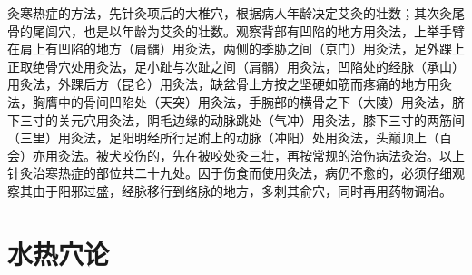 \documentclass[a4paper,12pt,UTF8,twoside]{ctexbook}
\begin{document}
灸寒热症的方法，先针灸项后的大椎穴，根据病人年龄决定艾灸的壮数；其次灸尾骨的尾闾穴，也是以年龄为艾灸的壮数。观察背部有凹陷的地方用灸法，上举手臂在肩上有凹陷的地方（肩髃）用灸法，两侧的季胁之间（京门）用灸法，足外踝上正取绝骨穴处用灸法，足小趾与次趾之间（肩髃）用灸法，凹陷处的经脉（承山）用灸法，外踝后方（昆仑）用灸法，缺盆骨上方按之坚硬如筋而疼痛的地方用灸法，胸膺中的骨间凹陷处（天突）用灸法，手腕部的横骨之下（大陵）用灸法，脐下三寸的关元穴用灸法，阴毛边缘的动脉跳处（气冲）用灸法，膝下三寸的两筋间（三里）用灸法，足阳明经所行足跗上的动脉（冲阳）处用灸法，头巅顶上（百会）亦用灸法。被犬咬伤的，先在被咬处灸三壮，再按常规的治伤病法灸治。以上针灸治寒热症的部位共二十九处。因于伤食而使用灸法，病仍不愈的，必须仔细观察其由于阳邪过盛，经脉移行到络脉的地方，多刺其俞穴，同时再用药物调治。

\chapter{水热穴论}
\end{document}
